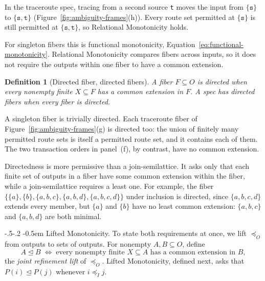 \documentclass[sigconf]{cidr-2027}
\makeatletter
\newtheorem{definition}{Definition}
\theoremstyle{remark}
\renewcommand\paragraph{\@startsection{paragraph}{4}{\z@}%
  {-.5\baselineskip \@plus -2\p@ \@minus -.2\p@}%
  {-0.5em}%
  {\normalfont\bfseries}}
\newcommand{\InputOrd}{\preceq_I}
\newcommand{\OutputOrd}{\preceq_O}
\newcommand{\LiftedOrd}{\trianglelefteq}
\newcommand{\outrel}{extends\xspace}          %
\newcommand{\fiber}[1]{P(#1)}
\makeatother
\begin{document}
In the traceroute spec, tracing from a second source \texttt{t} moves the
input from $\{\texttt{s}\}$ to $\{\texttt{s},\texttt{t}\}$
(Figure~\ref{fig:ambiguity-frames}(h)). Every route set permitted at
$\{\texttt{s}\}$ is still permitted at $\{\texttt{s},\texttt{t}\}$, so
Relational Monotonicity holds.

\textcolor{reviewed}{For singleton fibers this is functional monotonicity,
Equation~\ref{eq:functional-monotonicity}.} Relational Monotonicity compares fibers across inputs, so it does not
require the outputs within one fiber to have a common extension.

\begin{definition}[Directed fiber, directed fibers]
\label{def:fiber-directedness}\label{def:directed-outputs}
\textcolor{reviewed}{A fiber $F\subseteq O$ is \emph{directed} when every nonempty finite
$X\subseteq F$ has a common extension in $F$.} \textcolor{reviewed}{A spec has \emph{directed fibers} when
every fiber is directed.}
\end{definition}

\textcolor{reviewed}{A singleton fiber is trivially directed.} \textcolor{reviewed}{Each traceroute fiber of
Figure~\ref{fig:ambiguity-frames}(g) is directed too: the union of finitely
many permitted route sets is itself a permitted route set, and it contains each
of them.} The two transaction orders in panel~(f), by contrast, have no common extension.

\textcolor{reviewed}{Directedness is more permissive than a join-semilattice.} \textcolor{reviewed}{It asks only that
each finite set of outputs in a fiber have some common extension within the
fiber, while a join-semilattice requires a least one.} \textcolor{reviewed}{For example, the fiber
$\{\{a\},\{b\},\{a,b,c\},\{a,b,d\},\{a,b,c,d\}\}$ under inclusion is directed,
since $\{a,b,c,d\}$ \outrel every member, but $\{a\}$ and $\{b\}$ have no least common extension: $\{a,b,c\}$ and $\{a,b,d\}$ are both minimal.}

\paragraph{Lifted Monotonicity.}
To state both requirements at once, we lift $\OutputOrd$ from outputs to sets
of outputs. For nonempty
$A,B\subseteq O$, define
        \begin{equation}
  A\LiftedOrd B
  \;\Longleftrightarrow\;
  \text{every nonempty finite }X\subseteq A\text{ has a common extension in }B,
  \label{eq:joint-output-order}
        \end{equation}
the \emph{joint refinement lift} of $\OutputOrd$. Lifted Monotonicity, defined
next, asks that $\fiber{i}\LiftedOrd\fiber{j}$ whenever $i\InputOrd j$.
\end{document}
